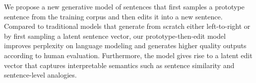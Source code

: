 We propose a new generative model of sentences that first samples a prototype sentence from the training corpus and then edits it into a new sentence. Compared to traditional models that generate from scratch either left-to-right or by first sampling a latent sentence vector, our prototype-then-edit model improves perplexity on language modeling and generates higher quality outputs according to human evaluation. Furthermore, the model gives rise to a latent edit vector that captures interpretable semantics such as sentence similarity and sentence-level analogies.